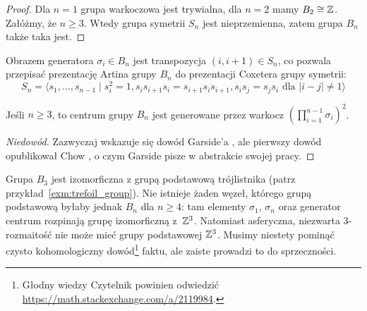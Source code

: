 \begin{proof}
    Dla $n = 1$ grupa warkoczowa jest trywialna, dla $n = 2$ mamy $B_2 \cong \mathbb Z$.
    Załóżmy, że $n \ge 3$. Wtedy grupa symetrii $S_n$ jest nieprzemienna, zatem grupa $B_n$ także taka jest.
\end{proof}

Obrazem generatora $\sigma_i \in B_n$ jest transpozycja $(i, i+1) \in S_n$, co pozwala przepisać prezentację Artina grupy $B_n$ do prezentacji Coxetera grupy symetrii:
%
\begin{equation}
    S_n = \langle s_1, \ldots, s_{n-1} \mid
    s_i^2 = 1,
    s_{i}s_{i+1}s_{i} = s_{i+1}s_{i}s_{i+1},
    s_is_j = s_js_i \mbox{ dla } |i-j| \neq 1 \rangle
\end{equation}

\begin{proposition}
    Jeśli $n \ge 3$, to centrum grupy $B_n$ jest generowane przez warkocz $(\prod_{i = 1}^{n-1} \sigma_i)^2$.
\end{proposition}

\begin{proof}[Niedowód]
%
%
    Zazwyczaj wskazuje się dowód Garside'a \cite{garside69}, ale pierwszy dowód opublikował Chow \cite{chow48}, o czym Garside pisze w abstrakcie swojej pracy.
\end{proof}

Grupa $B_3$ jest izomorficzna z grupą podstawową trójlistnika (patrz przykład~\ref{exm:trefoil_group}).
Nie istnieje żaden węzeł, którego grupą podstawową byłaby jednak $B_n$ dla $n \ge 4$: tam elementy $\sigma_1$, $\sigma_n$ oraz generator centrum rozpinają grupę izomorficzną z~$\mathbb Z^3$.
Natomiast asferyczna, niezwarta 3-rozmaitość nie może mieć grupy podstawowej $\mathbb Z^3$.
Musimy niestety pominąć czysto kohomologiczny dowód\footnote{Głodny wiedzy Czytelnik powinien odwiedzić \url{https://math.stackexchange.com/a/2119984}.} faktu, ale zaiste prowadzi to do sprzeczności.









%


